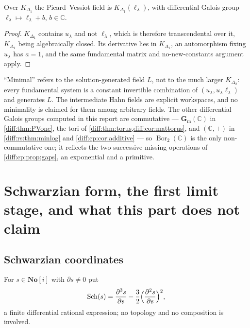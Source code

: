 \documentclass[11pt,letterpaper]{article}
\numberwithin{equation}{section}
\theoremstyle{definition}
\theoremstyle{remark}
\newcommand{\SC}{\mathbf{No}[i]}
\newcommand{\C}{\mathbb C}
\newcommand{\der}{\partial}
\newcommand{\gm}{\mathbf G_{\mathrm m}}
\newcommand{\Sch}{\operatorname{Sch}}
\newcommand{\Bor}{\operatorname{Bor}}
\begin{document}
\begin{corollary}
\label{diff:cp:cor:additive}
Over $K_{\Delta_{1}}$ the Picard--Vessiot field is $K_{\Delta_{1}}(\ell_{\lambda})$,
with differential Galois group $\ell_{\lambda}\mapsto\ell_{\lambda}+b$, $b\in\C$.
\end{corollary}
\begin{proof}
$K_{\Delta_{1}}$ contains $u_{\lambda}$ and not $\ell_{\lambda}$, which is therefore
transcendental over it, $K_{\Delta_{1}}$ being algebraically closed. Its
derivative lies in $K_{\Delta_{1}}$, an automorphism fixing $u_{\lambda}$ has
$a=1$, and the same fundamental matrix and no-new-constants argument apply.
\end{proof}

\begin{remark}
\label{diff:cp:rem:pvscope}
``Minimal'' refers to the solution-generated field $L$, not to the much larger
$K_{\Delta_{2}}$: every fundamental system is a constant invertible
combination of $(u_{\lambda},u_{\lambda}\ell_{\lambda})$ and generates $L$. The
intermediate Hahn fields are explicit workspaces, and no minimality is claimed
for them among arbitrary fields. The other differential Galois groups computed
in this report are commutative --- $\gm(\C)$ in \cref{diff:thm:PVone}, the tori
of \cref{diff:thm:torus,diff:cor:mattorus}, and $(\C,+)$ in
\cref{diff:rs:thm:minlog} and \cref{diff:cp:cor:additive} --- so
$\Bor_{2}(\C)$ is the only non-commutative one; it reflects the two successive
missing operations of \cref{diff:cp:prop:gaps}, an exponential and a primitive.
\end{remark}

\section{Schwarzian form, the first limit stage, and what this part does not claim}
\label{diff:cp:sec:schwarzian}

\subsection{Schwarzian coordinates}
\label{diff:cp:sub:schwarzian}

For $s\in\SC$ with $\der s\neq0$ put
\begin{equation}\label{diff:cp:eq:schwarzian}
 \Sch(s)=\frac{\der^{3}s}{\der s}-\frac32\Bigl(\frac{\der^{2}s}{\der s}\Bigr)^{2},
\end{equation}
a finite differential rational expression; no topology and no composition is
involved.
\end{document}
